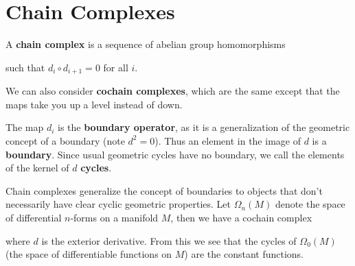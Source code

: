 \documentclass[twoside,10pt]{article}
\begin{document}
\tableofcontents


\section{Chain Complexes}

\begin{defn}[]
	A \textbf{chain complex} is a sequence of abelian group homomorphisms
\begin{center}
\end{center}
such that $d_i \circ d_{i+1}=0$ for all $i$.
\end{defn}

We can also consider \textbf{cochain complexes}, which are the same except that the maps take you up a level instead of down.
\begin{center}
\end{center}

The map $d_i$ is the \textbf{boundary operator}, as it is a generalization of the geometric concept of a boundary (note $d^2=0$). Thus an element in the image of $d$ is a \textbf{boundary}. Since usual geometric cycles have no boundary, we call the elements of the kernel of $d$ \textbf{cycles}.


\begin{ex}[]
	Chain complexes generalize the concept of boundaries to objects that don't necessarily have clear cyclic geometric properties. Let $\Omega_n(M)$ denote the space of differential $n$-forms on a manifold $M$, then we have a cochain complex
\begin{center}
\end{center}
where $d$ is the exterior derivative. From this we see that the cycles of $\Omega_0(M)$ (the space of differentiable functions on $M$) are the constant functions.
\end{ex}
\end{document}
